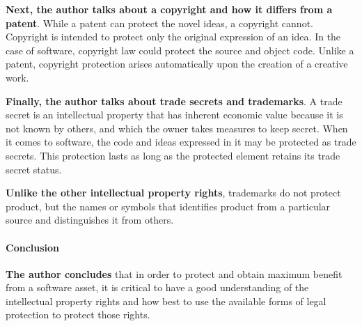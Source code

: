 \documentclass{article}
\begin{document}
\textbf{Next, the author talks about a copyright and how it differs from a patent}. While a patent can protect the novel ideas, a copyright cannot. Copyright is intended to protect only the original expression of an idea. In the case of software, copyright law could protect the source and object code. Unlike a patent, copyright protection arises automatically upon the creation of a creative work.

\textbf{Finally, the author talks about trade secrets and trademarks}. A trade secret is an intellectual property that has inherent economic value because it is not known by others, and which the owner takes measures to keep secret. When it comes to software, the code and ideas expressed in it may be protected as trade secrets. This protection lasts as long as the protected element retains its trade secret status.

\textbf{Unlike the other intellectual property rights}, trademarks do not protect product, but the names or symbols that identifies product from a particular source and distinguishes it from others.

\paragraph{Conclusion}

\textbf{The author concludes} that in order to protect and obtain maximum benefit from a software asset, it is critical to have a good understanding of the intellectual property rights and how best to use the available forms of legal protection to protect those rights.
\end{document}
